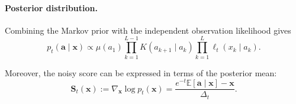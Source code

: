 \paragraph{Posterior distribution.}
Combining the Markov prior with the independent observation
likelihood gives
\begin{equation}
p_t(\mathbf{a}\mid\mathbf{x})
\propto
\mu(a_1)
\prod_{k=1}^{L-1}K(a_{k+1}\mid a_k)
\prod_{k=1}^{L}\ell_t(x_k\mid a_k).
\label{eq:posterior_chain}
\end{equation}

Moreover, the noisy score can be expressed in terms of the posterior mean:
\begin{equation}
    \mathbf S_t(\mathbf x)
    := \nabla_{\mathbf x}\log p_t(\mathbf x)
    =
    \frac{e^{-t}\mathbb E[\mathbf a\mid\mathbf x]-\mathbf x}
         {\Delta_t}.
    \label{eq:tweedie}
\end{equation}


